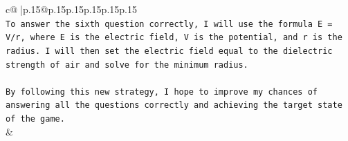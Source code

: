 \documentclass{article}
\begin{document}
{\begin{supertabular}{c@{$\;$}|p{.15\linewidth}@{}p{.15\linewidth}p{.15\linewidth}p{.15\linewidth}p{.15\linewidth}p{.15\linewidth}}
{{{\\ 
\texttt{To answer the sixth question correctly, I will use the formula E = V/r, where E is the electric field, V is the potential, and r is the radius. I will then set the electric field equal to the dielectric strength of air and solve for the minimum radius.} \\
\\ 
\texttt{By following this new strategy, I hope to improve my chances of answering all the questions correctly and achieving the target state of the game.} \\
            }
        }
    }
    & \\ \\

\end{supertabular}
}
\end{document}
